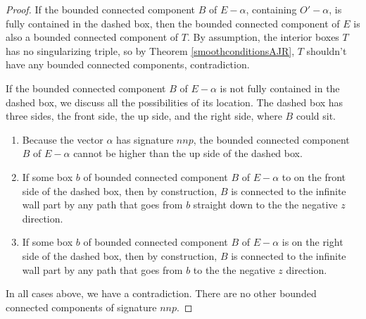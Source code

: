 \documentclass{amsart}[10pt]
\theoremstyle{plain}
\theoremstyle{definition}
\begin{document}
\begin{proof}
If the bounded connected component $B$ of $E-\alpha$, containing $O'-\alpha$, is fully contained in the dashed box, then the bounded connected component of $E$ is also a bounded connected component of $T$. By assumption, the interior boxes $T$ has no singularizing triple, so by Theorem \ref{smoothconditionsAJR}, $T$ shouldn't have any bounded connected components, contradiction. 

If the bounded connected component $B$ of $E-\alpha$ is not fully contained in the dashed box, we discuss all the possibilities of its location. The dashed box has three sides, the front side, the up side, and the right side, where $B$ could sit. 

\begin{enumerate}
\item Because the vector $\alpha$ has signature $nnp$,  the bounded connected component $B$ of $E-\alpha$ cannot be higher than the up side of the dashed box. 

\item If some box $b$ of bounded connected component $B$ of $E-\alpha$ to on the front side of the dashed box, then by construction, $B$ is connected to the infinite wall part by any path that goes from $b$ straight down to the the negative $z$ direction.

\item If some box $b$ of bounded connected component $B$ of $E-\alpha$ is on the right side of the dashed box, then by construction, $B$ is connected to the infinite wall part by any path that goes from $b$ to the the negative $z$ direction.

\end{enumerate}

In all cases above, we have a contradiction. There are no other bounded connected components of signature $nnp$.




\end{proof}
\end{document}
